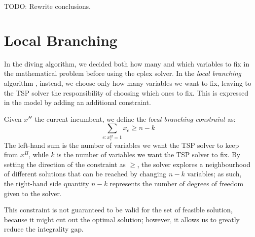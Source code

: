 TODO: Rewrite conclusions.

\section{Local Branching}

In the diving algorithm, we decided both how many and which variables to fix in the mathematical problem before using the cplex solver. In the \textit{local branching} algorithm \cite{Fischetti2003}, instead, we choose only how many variables we want to fix, leaving to the TSP solver the responsibility of choosing which ones to fix. This is expressed in the model by adding an additional constraint.

Given $x^H$ the current incumbent, we define the \textit{local branching constraint} as:
$$\sum_{e:x^H_e=1}x_e\geq n-k$$
The left-hand sum is the number of variables we want the TSP solver to keep from $x^H$, while $k$ is the number of variables we want the TSP solver to fix. By setting the direction of the constraint as $\geq$, the solver explores a neighbourhood of different solutions that can be reached by changing $n-k$ variables; as such, the right-hand side quantity $n-k$ represents the number of degrees of freedom given to the solver.

This constraint is not guaranteed to be valid for the set of feasible solution, because it might cut out the optimal solution; however, it allows us to greatly reduce the integrality gap.

\FloatBarrier
